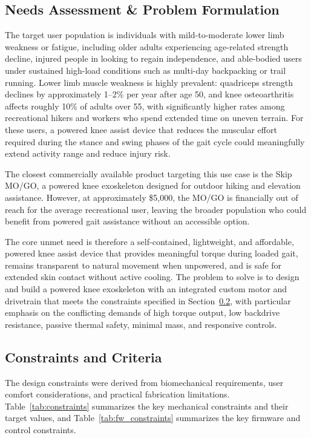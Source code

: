 \documentclass[11pt]{article}
\begin{document}
\subsection{Needs Assessment \& Problem Formulation}
The target user population is individuals with mild-to-moderate lower limb weakness or fatigue, including older adults experiencing age-related strength decline, 
injured people in looking to regain independence, and able-bodied users under sustained high-load conditions such as multi-day backpacking or trail running. 
Lower limb muscle weakness is highly prevalent: quadriceps strength declines by approximately 1--2\% per year after age 50, and knee osteoarthritis affects roughly 10\% of adults over 55, 
with significantly higher rates among recreational hikers and workers who spend extended time on uneven terrain. For these users, 
a powered knee assist device that reduces the muscular effort required during the stance and swing phases of the gait cycle could meaningfully extend activity range and reduce injury risk.

The closest commercially available product targeting this use case is the Skip MO/GO, a powered knee exoskeleton designed for outdoor hiking and elevation assistance. However, at approximately \$5{,}000, the MO/GO is financially out of reach for the average recreational user, leaving the broader population who could benefit from powered gait assistance without an accessible option.

The core unmet need is therefore a self-contained, lightweight, and affordable, powered knee assist device that provides meaningful torque during loaded gait, 
remains transparent to natural movement when unpowered, and is safe for extended skin contact without active cooling. 
The problem to solve is to design and build a powered knee exoskeleton with an integrated custom motor and drivetrain that meets the constraints specified in Section~\ref{sec:constraints}, 
with particular emphasis on the conflicting demands of high torque output, low backdrive resistance, passive thermal safety, minimal mass, and responsive controls.

\subsection{Constraints and Criteria}
\label{sec:constraints}

The design constraints were derived from biomechanical requirements, user comfort considerations, and practical fabrication limitations. Table~\ref{tab:constraints} summarizes the key mechanical constraints and their target values, and Table~\ref{tab:fw_constraints} summarizes the key firmware and control constraints.
\end{document}
